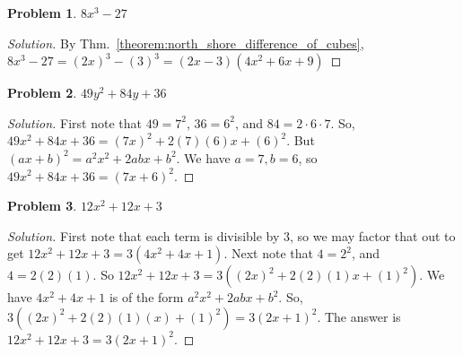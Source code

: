\documentclass{article}
\theoremstyle{mystyle}
\newtheorem{problem}{Problem}[section]
\begin{document}
\begin{problem}
$8x^3 - 27$
\end{problem}
\begin{proof}[Solution]
By Thm.~\ref{theorem:north_shore_difference_of_cubes}, $8x^3 - 27 = (2x)^3 - (3)^3 = (2x-3)(4x^2+6x+9)$
\end{proof}
\begin{problem}
$49y^2 + 84y + 36$
\end{problem}
\begin{proof}[Solution]
First note that $49 = 7^2$, $36 = 6^2$, and $84 = 2\cdot 6 \cdot 7$. So, $49x^2 + 84x + 36 = (7x)^2 + 2(7)(6)x + (6)^2$. But $(ax+b)^2 = a^2x^2 + 2abx + b^2$. We have $a=7,b=6$, so $49x^2 + 84x + 36 = (7x+6)^2$.
\end{proof}
\begin{problem}
$12x^2 + 12x + 3$
\end{problem}
\begin{proof}[Solution]
First note that each term is divisible by $3$, so we may factor that out to get $12x^2 + 12x + 3 = 3(4x^2+4x+1)$. Next note that $4 = 2^2$, and $4 = 2(2)(1)$. So $12x^2+12x+3 = 3((2x)^2 + 2(2)(1)x + (1)^2)$. We have $4x^2 + 4x + 1$ is of the form $a^2x^2 + 2abx + b^2$. So, $3((2x)^2+2(2)(1)(x) + (1)^2) = 3(2x+1)^2$. The answer is $12x^2+12x+3 = 3(2x+1)^2$.
\end{proof}
\end{document}
